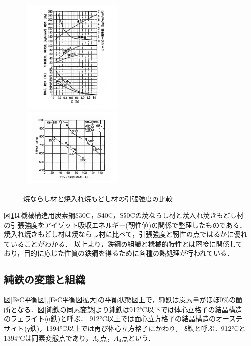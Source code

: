 \documentclass[a4paper,11pt,uplatex]{jsarticle}
\begin{document}
\begin{figure}[H]
  \begin{tabular}{cc}
    \begin{minipage}{0.5\hsize}
      \begin{center}
        \includegraphics[width = 5cm]{画像/機械的特性.png}
        \caption{機械的特性と炭素量の関係}
        \label{機械的特性}
      \end{center}
    \end{minipage}

    \begin{minipage}{0.5\hsize}
      \begin{center}
        \includegraphics[width = 5cm]{画像/引張強度の比較.png}
        \caption{焼ならし材と焼入れ焼もどし材の引張強度の比較}
        \label{引張強度の比較}
      \end{center}
    \end{minipage}
  \end{tabular}
\end{figure}
図\ref{引張強度の比較}は機械構造用炭素鋼S30C，S40C，S50Cの焼ならし材と焼入れ焼きもどし材の引張強度をアイゾット吸収エネルギー(靭性値)の関係で整理したものである．
焼入れ焼きもどし材は焼ならし材に比べて，引張強度と靭性の点ではるかに優れていることがわかる．
以上より，鉄鋼の組織と機械的特性とは密接に関係しており，目的に応じた性質の鉄鋼を得るために各種の熱処理が行われている．

\subsection{純鉄の変態と組織}
図\ref{FeC平衡図},\ref{FeC平衡図拡大}の平衡状態図上で，純鉄は炭素量がほぼ0\%の箇所となる．図\ref{純鉄の同素変態}より純鉄は912°C以下では体心立格子の結晶構造のフェライト(α鉄)と呼ぶ．
912°C以上では面心立方格子の結晶構造のオーステサイト(γ鉄)，1394°C以上では再び体心立方格子にかわり，
δ鉄と呼ぶ．912°Cと1394°Cは同素変態点であり，$A_3$点，$A_4$点という．
\end{document}
